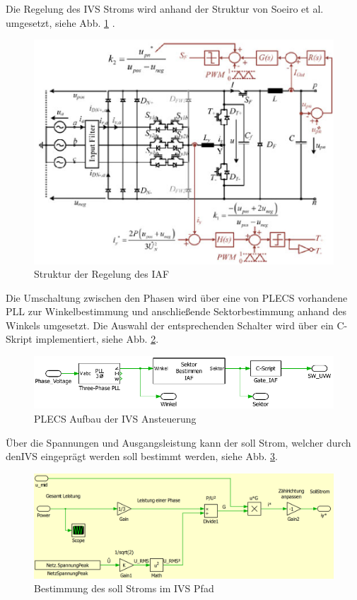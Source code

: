 	Die Regelung des \gls{IVS} Stroms wird anhand der Struktur von Soeiro et al. umgesetzt, siehe Abb. \ref{fig:iafpapercontrol} \cite{Soeiro.2013}. 
	 \begin{figure}[H]
		\centering
		\includegraphics[width=0.7\linewidth]{content/Grafiken/IAF_Paper_Control}
		\caption{Struktur der Regelung des IAF \cite{Soeiro.2013}}
		\label{fig:iafpapercontrol}
	\end{figure}
	Die Umschaltung zwischen den Phasen wird über eine von \gls{PLECS} vorhandene \gls{PLL} zur Winkelbestimmung und anschließende Sektorbestimmung anhand des Winkels umgesetzt. Die Auswahl der entsprechenden Schalter wird über ein C-Skript implementiert, siehe Abb. \ref{fig:plecsiafivscontrol}. 
	\begin{figure}[H]
		\centering
		\includegraphics[width=1\linewidth]{content/Grafiken/PlecsIAFivscontrol}
		\caption{PLECS Aufbau der \gls{IVS} Ansteuerung}
		\label{fig:plecsiafivscontrol}
	\end{figure}
	Über die Spannungen und Ausgangsleistung kann der soll Strom, welcher durch den\gls{IVS} eingeprägt werden soll bestimmt werden, siehe Abb. \ref{fig:plecsiafivsi}.
	\begin{figure}
		\centering
		\includegraphics[width=1\linewidth]{content/Grafiken/PlecsIAFivsI}
		\caption{Bestimmung des soll Stroms im IVS Pfad}
		\label{fig:plecsiafivsi}
		
	\end{figure}
